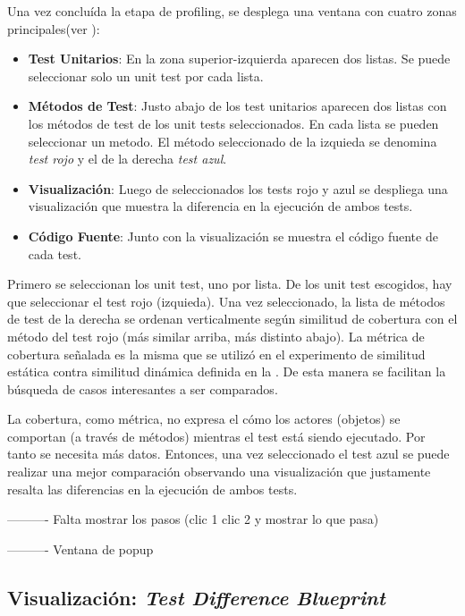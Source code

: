 \par Una vez concluída la etapa de profiling, se desplega una ventana con cuatro zonas principales(ver ): 
\begin{itemize}
\item {\bf Test Unitarios}: En la zona superior-izquierda aparecen dos listas. Se puede seleccionar solo un unit test por cada lista.
\item {\bf Métodos de Test}: Justo abajo de los test unitarios aparecen dos listas con los métodos de test de los unit tests seleccionados. En cada lista se pueden seleccionar un metodo. El método seleccionado de la izquieda se denomina \emph{test rojo} y el de la derecha \emph{test azul}.
\item {\bf Visualización}: Luego de seleccionados los tests rojo y azul se despliega una visualización que muestra la diferencia en la ejecución de ambos tests.
\item {\bf Código Fuente}: Junto con la visualización se muestra el código fuente de cada test.
\end{itemize}


\par Primero se seleccionan los unit test, uno por lista. De los unit test escogidos, hay que seleccionar el test rojo (izquieda). Una vez seleccionado, la lista de métodos de test de la derecha se ordenan verticalmente según similitud de cobertura con el método del test rojo (más similar arriba, más distinto abajo). La métrica de cobertura señalada es la misma que se utilizó en el experimento de similitud estática contra similitud dinámica definida en la . De esta manera se facilitan la búsqueda de casos interesantes a ser comparados. 

\par La cobertura, como métrica, no expresa el cómo los actores (objetos) se comportan (a través de métodos) mientras el test está siendo ejecutado. Por tanto se necesita más datos. Entonces, una vez seleccionado el test azul se puede realizar una mejor comparación observando una visualización que justamente resalta las diferencias en la ejecución de ambos tests.

\par ---------- Falta mostrar los pasos (clic 1 clic 2 y mostrar lo que pasa)
\par ---------- Ventana de popup

\subsection{Visualización: \emph{Test Difference Blueprint}}

